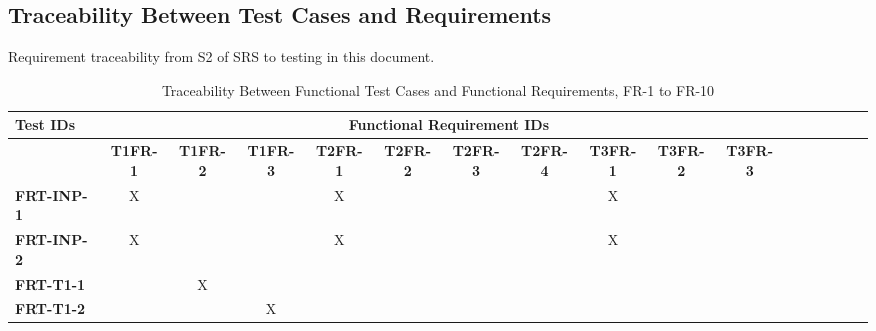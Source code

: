 \documentclass[12pt, titlepage]{article}
\begin{document}
\begin{landscape}

		\subsection{Traceability Between Test Cases and Requirements}

		Requirement traceability from S2 of SRS to testing in this document.

		\begin{longtable}{|l|cccccccccccccccc|}
			\caption{Traceability Between Functional Test Cases and Functional Requirements, FR-1 to FR-10}                                                                                                                                                                                                                           \\
			\hline
			\textbf{Test IDs}   & \multicolumn{11}{c|}{\textbf{Functional Requirement IDs}}                                                                                                                                                                                                                                         \\
			\hline
			~                   & \textbf{T1FR-1}                                              & \textbf{T1FR-2} & \textbf{T1FR-3} & \textbf{T2FR-1} & \textbf{T2FR-2} & \textbf{T2FR-3} & \textbf{T2FR-4} & \textbf{T3FR-1} & \textbf{T3FR-2} & \textbf{T3FR-3}  \\
			\hline
   		\textbf{FRT-INP-1}  & X                                                         & ~            & ~            & X            & ~            & ~            & ~            & X            & ~            & ~             \\
        	\textbf{FRT-INP-2}  & X                                                         & ~            & ~            & X            & ~            & ~            & ~            & X            & ~            & ~             \\
			\textbf{FRT-T1-1}  & ~                                                         & X            & ~            & ~            & ~            & ~            & ~            & ~            & ~            & ~             \\
      	\textbf{FRT-T1-2}  & ~                                                         & ~            & X            & ~            & ~            & ~            & ~            & ~            & ~            & ~             \\

\end{longtable}
\end{landscape}
\end{document}
